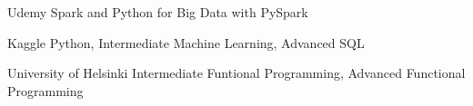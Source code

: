 
\begin{cvskills}

  \cvskill
    {Udemy} %
    {Spark and Python for Big Data with PySpark}

  \cvskill
    {Kaggle} %
    {Python, Intermediate Machine Learning, Advanced SQL} %

  \cvskill
    {University of Helsinki} %
    {Intermediate Funtional Programming, Advanced Functional Programming} %

\end{cvskills}
